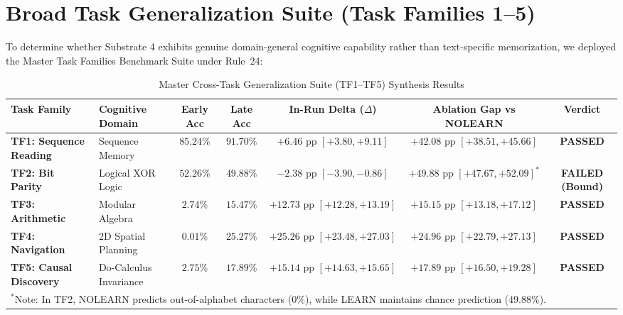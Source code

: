 \documentclass[10pt,journal,compsoc]{IEEEtran}
\begin{document}
\section{Broad Task Generalization Suite (Task Families 1--5)}
\label{sec:tf_suite}

To determine whether Substrate 4 exhibits genuine domain-general cognitive capability rather than text-specific memorization, we deployed the Master Task Families Benchmark Suite under Rule~24:

\begin{table}[!ht]
\centering
\caption{Master Cross-Task Generalization Suite (TF1--TF5) Synthesis Results}
\label{tab:tf_results}
\begin{tabular}{llccccc}
\toprule
\textbf{Task Family} & \textbf{Cognitive Domain} & \textbf{Early Acc} & \textbf{Late Acc} & \textbf{In-Run Delta ($\Delta$)} & \textbf{Ablation Gap vs NOLEARN} & \textbf{Verdict} \\
\midrule
\textbf{TF1: Sequence Reading} & Sequence Memory & $85.24\%$ & $91.70\%$ & $+6.46\text{ pp } [+3.80, +9.11]$ & $+42.08\text{ pp } [+38.51, +45.66]$ & \textbf{PASSED} \\
\textbf{TF2: Bit Parity} & Logical XOR Logic & $52.26\%$ & $49.88\%$ & $-2.38\text{ pp } [-3.90, -0.86]$ & $+49.88\text{ pp } [+47.67, +52.09]^*$ & \textbf{FAILED (Bound)} \\
\textbf{TF3: Arithmetic} & Modular Algebra & $2.74\%$ & $15.47\%$ & $+12.73\text{ pp } [+12.28, +13.19]$ & $+15.15\text{ pp } [+13.18, +17.12]$ & \textbf{PASSED} \\
\textbf{TF4: Navigation} & 2D Spatial Planning & $0.01\%$ & $25.27\%$ & $+25.26\text{ pp } [+23.48, +27.03]$ & $+24.96\text{ pp } [+22.79, +27.13]$ & \textbf{PASSED} \\
\textbf{TF5: Causal Discovery} & Do-Calculus Invariance & $2.75\%$ & $17.89\%$ & $+15.14\text{ pp } [+14.63, +15.65]$ & $+17.89\text{ pp } [+16.50, +19.28]$ & \textbf{PASSED} \\
\bottomrule
\multicolumn{7}{l}{\footnotesize $^*$Note: In TF2, NOLEARN predicts out-of-alphabet characters ($0\%$), while LEARN maintains chance prediction ($49.88\%$).}
\end{tabular}
\end{table}
\end{document}
